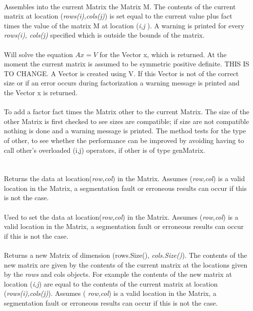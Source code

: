  \\
Assembles into the current Matrix the Matrix \p M. The contents of the
current matrix at location ({\em rows(i),cols(j)}) is set equal to the
current value plus \p fact times the value of the matrix \p M
at location ({\em i,j }). A warning is printed for every {\em rows(i),
cols(j)} specified which is outside the bounds of the matrix. \\

 \\
Will solve the equation {\em $Ax=V$} for the Vector \p x, which is
returned. At the moment the current matrix is assumed to be symmetric
positive definite. THIS IS TO CHANGE. A Vector is created using
\p V. If this Vector is not of the correct size or if an error occurs
during factorization a warning message is printed and the Vector \p x
is returned. \\ 

 \\ 
To add a factor \p fact times the Matrix \p other to the current
Matrix. The size of the other Matrix is first checked to see sizes are 
compatible; if size are not compatible nothing is done and a warning
message is printed. The method tests for the type of \p other, to see
whether the performance can be improved by avoiding having to call
\p other's overloaded (i,j) operators, if \p other is of type
genMatrix. \\ 


  \\
 \\
Returns the data at location({\em row,col}) in the Matrix. Assumes
({\em row,col}) is a valid location in the Matrix, a segmentation
fault or erroneous results can occur if this is not the case.\\

 \\
Used to set the data at location({\em row,col}) in the Matrix. Assumes
({\em row,col}) is a valid location in the Matrix, a segmentation
fault or erroneous results can occur if this is not the case. \\

\\ 
Returns a new Matrix of dimension (rows.Size(), {\em
cols.Size()}). The contents of the new matrix are given by the
contents of the current matrix at the locations given by the {\em
rows} and \p cols objects. For example the contents of the new
matrix at location ({\em i,j}) are equal to the contents of the
current matrix at location ({\em rows(i),cols(j)}). Assumes ({\em
row,col}) is a valid location in the Matrix, a segmentation fault or
erroneous results can occur if this is not the case. \\

